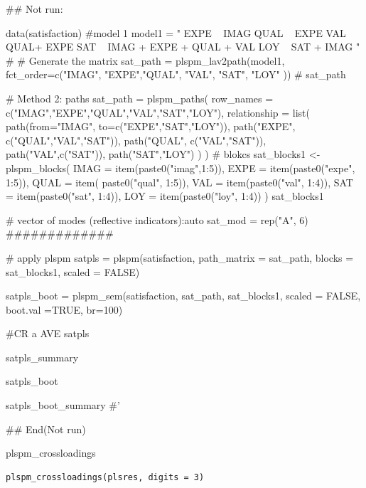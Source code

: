 \documentclass[a4paper]{book}
\begin{document}
\begin{Examples}
\begin{ExampleCode}

\#\# Not run: 

data(satisfaction)
#model 1
model1 = "
EXPE ~ IMAG
QUAL ~ EXPE
VAL ~  QUAL+ EXPE
SAT ~ IMAG + EXPE + QUAL + VAL
LOY ~ SAT + IMAG
"
# # Generate the matrix
sat_path = plspm_lav2path(model1,
                          fct_order=c("IMAG", "EXPE","QUAL", "VAL", "SAT", "LOY" ))
# sat_path

# Method 2: paths
sat_path = plspm_paths(
  row_names = c("IMAG","EXPE","QUAL","VAL","SAT","LOY"),
  relationship = list(
    path(from="IMAG", to=c("EXPE","SAT","LOY")),
    path("EXPE", c("QUAL","VAL","SAT")),
    path("QUAL", c("VAL","SAT")),
    path("VAL",c("SAT")),
    path("SAT","LOY")
  )
)
# blokcs
sat_blocks1 <- plspm_blocks(
  IMAG = item(paste0("imag",1:5)),
  EXPE = item(paste0("expe", 1:5)),
  QUAL = item( paste0("qual", 1:5)),
  VAL = item(paste0("val", 1:4)),
  SAT = item(paste0("sat", 1:4)),
  LOY = item(paste0("loy", 1:4))
)
sat_blocks1

# vector of modes (reflective indicators):auto
sat_mod = rep("A", 6)
#############

# apply plspm
satpls = plspm(satisfaction,
                   path_matrix = sat_path,
                   blocks = sat_blocks1,
                   scaled = FALSE)

satpls_boot = plspm_sem(satisfaction, sat_path, sat_blocks1, scaled = FALSE,
                        boot.val =TRUE, br=100)

#CR a AVE
satpls%

satpls_summary%

satpls_boot%

satpls_boot_summary%
#'

## End(Not run)



\end{ExampleCode}
\end{Examples}
%
\begin{Description}
plspm\_crossloadings
\end{Description}
%
\begin{Usage}
\begin{verbatim}
plspm_crossloadings(plsres, digits = 3)
\end{verbatim}
\end{Usage}
\end{document}
